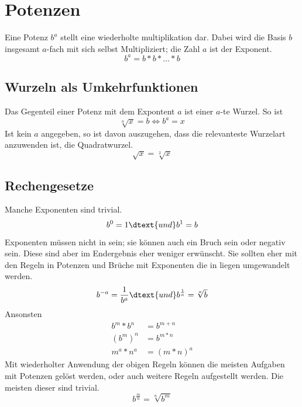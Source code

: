 \documentclass{article}
\begin{document}
\section{Potenzen} 
Eine Potenz $b^a$ stellt eine wiederholte multiplikation dar. Dabei wird die Basis $b$ insgesamt $a$-fach mit sich selbst Multipliziert; die Zahl $a$ ist der Exponent.
\[
 b^a = b*b* \dots{} *b
\]

\subsection{Wurzeln als Umkehrfunktionen}
Das Gegenteil einer Potenz mit dem Expontent $a$ ist einer $a$-te Wurzel. So ist
\[
 \sqrt[a]{x} = b
 \Leftrightarrow
 b^a=x
\]
Ist kein $a$ angegeben, so ist davon auszugehen, dass die relevanteste Wurzelart anzuwenden ist, die Quadratwurzel.
\[
 \sqrt{x} = \sqrt[2]{x}
\]

\subsection{Rechengesetze}
Manche Exponenten sind trivial.
\[
 b^0 = 1 \dtext{und} b^1=b
\]
Exponenten müssen nicht in \tN sein; sie können auch ein Bruch sein oder negativ sein. Diese sind aber im Endergebnis eher weniger erwünscht. Sie sollten eher mit den Regeln in Potenzen und Brüche mit Exponenten die in \tN liegen umgewandelt werden. 
\[
 b^{-a} = \frac{1}{b^a}
 \dtext{und}
 b^\frac{1}{a} = \sqrt[a]{b}
\]
Ansonsten
\begin{align*}
 b^m * b^n &= b^{m+n} \\
 (b^m)^n &= b^{m*n} \\
 m^a * n^a &= (m*n)^a
\end{align*}
Mit wiederholter Anwendung der obigen Regeln können die meisten Aufgaben mit Potenzen gelöst werden, oder auch weitere Regeln aufgestellt werden. Die meisten dieser sind trivial.
\[
 b^\frac{m}{n} = \sqrt[n]{b^m}
\]
\end{document}
